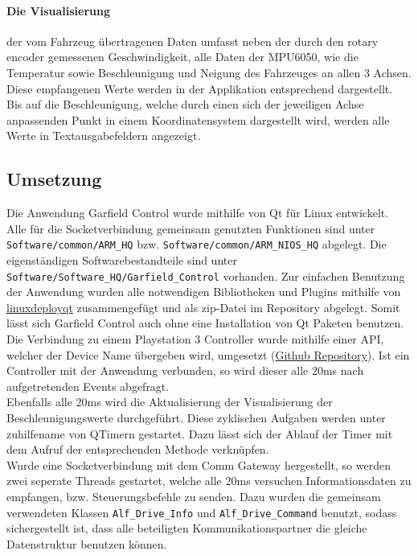 \paragraph{Die Visualisierung} der vom Fahrzeug übertragenen Daten umfasst neben der durch den rotary encoder gemessenen Geschwindigkeit, alle Daten der MPU6050, wie die Temperatur sowie Beschleunigung und Neigung des Fahrzeuges an allen 3 Achsen. Diese empfangenen Werte werden in der Applikation entsprechend dargestellt. Bis auf die Beschleunigung, welche durch einen sich der jeweiligen Achse anpassenden Punkt in einem Koordinatensystem dargestellt wird, werden alle Werte in Textausgabefeldern angezeigt.

\subsection{Umsetzung}
Die Anwendung Garfield Control wurde mithilfe von Qt für Linux entwickelt. Alle für die Socketverbindung gemeinsam genutzten Funktionen sind unter \texttt{Software/common/ARM\_HQ} bzw. \texttt{Software/common/ARM\_NIOS\_HQ} abgelegt. Die eigenständigen Softwarebestandteile sind unter \texttt{Software/Software\_HQ/Garfield\_Control} vorhanden. Zur einfachen Benutzung der Anwendung wurden alle notwendigen Bibliotheken und Plugins mithilfe von \href{https://github.com/probonopd/linuxdeployqt}{linuxdeployqt} zusammengefügt und als zip-Datei im Repository abgelegt. Somit lässt sich Garfield Control auch ohne eine Installation von Qt Paketen benutzen.\\
Die Verbindung zu einem Playstation 3 Controller wurde mithilfe einer API, welcher der Device Name übergeben wird, umgesetzt (\href{https://github.com/drewnoakes/joystick}{Github Repository}). Ist ein Controller mit der Anwendung verbunden, so wird dieser alle 20ms nach aufgetretenden Events abgefragt.\\
Ebenfalls alle 20ms wird die Aktualisierung der Visualisierung der Beschleunigungswerte durchgeführt. Diese zyklischen Aufgaben werden unter zuhilfename von QTimern gestartet. Dazu lässt sich der Ablauf der Timer mit dem Aufruf der entsprechenden Methode verknüpfen.\\
Wurde eine Socketverbindung mit dem Comm Gateway hergestellt, so werden zwei seperate Threads gestartet, welche alle 20ms versuchen Informationsdaten zu empfangen, bzw. Steuerungsbefehle zu senden. Dazu wurden die gemeinsam verwendeten Klassen \texttt{Alf\_Drive\_Info} und \texttt{Alf\_Drive\_Command} benutzt, sodass sichergestellt ist, dass alle beteiligten Kommunikationspartner die gleiche Datenstruktur benutzen können.